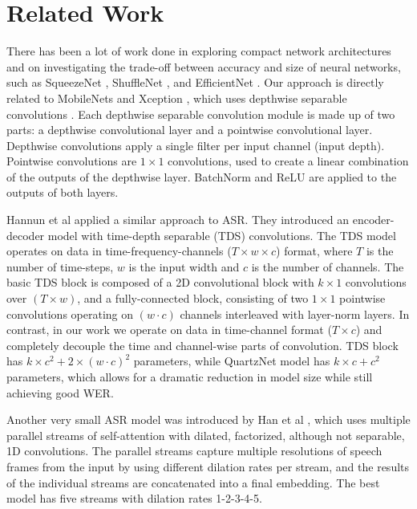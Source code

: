 \documentclass{article}
\begin{document}
\section{Related Work}
\label{sec:relatedwork}
There has been a lot of work done in exploring compact network architectures and on investigating the trade-off between accuracy and size of neural networks, such as SqueezeNet \cite{iandola2016}, ShuffleNet \cite{zhang2018}, and EfficientNet \cite{tan2019}.
Our approach is directly related to MobileNets \cite{howard2017, sandler2018} and Xception \cite{Chollet_2017}, which uses depthwise separable convolutions \cite{Sifre2014RigidMotionSF, vanhoucke2019}. Each depthwise separable convolution module is made up of two parts: a depthwise convolutional layer and a pointwise convolutional layer. Depthwise convolutions apply a single filter per input channel (input depth). Pointwise convolutions are $1\times1$  convolutions, used to create a linear combination of the outputs of the depthwise layer. BatchNorm and ReLU are applied to the outputs of both layers.

Hannun et al \cite{hannun2019} applied a similar approach to ASR. They introduced an encoder-decoder model with time-depth separable (TDS) convolutions. The TDS model operates on data in time-frequency-channels ($T \times w \times c$) format, where $T$ is the number of time-steps, $w$ is the input width and $c$ is the number of channels.
The basic TDS block is composed of a 2D convolutional block with  $k \times 1$ convolutions over $(T \times w)$, and a fully-connected block, consisting of two $1\times1$ pointwise convolutions operating on $(w \cdot c)$ channels interleaved with layer-norm layers.  In contrast, in our work we operate on data in time-channel format ($T\times c$) and completely decouple the time and channel-wise parts of convolution. TDS block has  $k \times c^2 + 2\times (w \cdot c)^2$ parameters, while  QuartzNet model has $k \times c + c^2$ parameters, which allows for a dramatic reduction in model size while still achieving good WER.

Another very small ASR model  was introduced by Han et al \cite{han2019stateoftheart}, which uses multiple parallel streams of self-attention with dilated, factorized, although not separable, 1D convolutions. The parallel streams capture multiple resolutions of speech frames from the input by using different dilation rates per stream, and the results of the individual streams are concatenated into a final embedding. The best model has five streams with dilation rates 1-2-3-4-5. 
\end{document}
